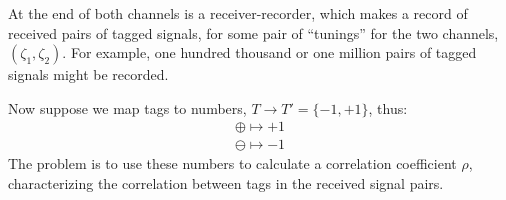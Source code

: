 \documentclass[9pt,technote]{IEEEtran}
\begin{document}
At the end of both channels is a receiver-recorder, which makes a
record of received pairs of tagged signals, for some pair of
``tunings'' for the two channels, $(\zeta_1,\zeta_2)$. For example,
one hundred thousand or one million pairs of tagged signals might be
recorded.

Now suppose we map tags to numbers, $T\to T'=\{-1,+1\}$, thus:
\begin{align}
  \oplus \mapsto +1 \\
  \ominus \mapsto -1
\end{align}
The problem is to use these numbers to calculate a correlation
coefficient $\rho$, characterizing the correlation between tags in the
received signal pairs.
\end{document}
